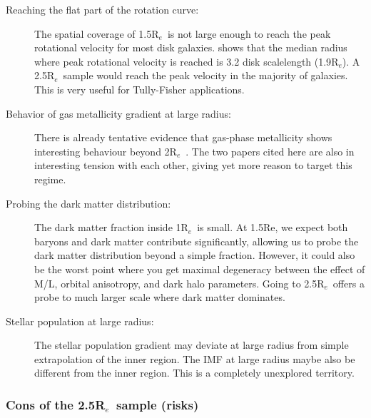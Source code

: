 \documentclass[preprint,11pt]{aastex}
\newcommand{\Reff}{{R$_{e}$}}
\begin{document}
\begin{description}
\item[Reaching the flat part of the rotation curve:] The spatial
  coverage of 1.5\Reff\ is not large enough to reach the peak
  rotational velocity for most disk galaxies. \cite{courteau97} shows
  that the median radius where peak rotational velocity is reached is
  3.2 disk scalelength (1.9\Reff). A 2.5\Reff\ sample would reach the
  peak velocity in the majority of galaxies. This is very useful for
  Tully-Fisher applications.

\item[Behavior of gas metallicity gradient at large radius:]

  There is already tentative evidence that gas-phase metallicity shows interesting behaviour beyond 2\Reff\ \citep{moran12,sanchez13}. The two papers
  cited here are also in interesting tension with each other, giving yet more reason to target this regime.

\item[Probing the dark matter distribution:] The dark matter fraction
  inside 1\Reff\ is small. At 1.5Re, we expect both baryons and dark
  matter contribute significantly, allowing us to probe the dark
  matter distribution beyond a simple fraction. However, it could also
  be the worst point where you get maximal degeneracy between the
  effect of M/L, orbital anisotropy, and dark halo parameters. Going
  to 2.5\Reff\ offers a probe to much larger scale where dark matter
  dominates.

\item[Stellar population at large radius:] The stellar population
  gradient may deviate at large radius from simple extrapolation of
  the inner region. The IMF at large radius maybe also be different
  from the inner region. This is a completely unexplored territory.
\end{description}

\subsubsection{Cons of the 2.5\Reff\ sample (risks)}
\end{document}

